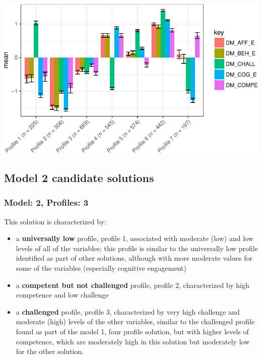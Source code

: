 \documentclass[]{book}
\providecommand{\tightlist}{%
  \setlength{\itemsep}{0pt}\setlength{\parskip}{0pt}}
\theoremstyle{definition}
\theoremstyle{definition}
\theoremstyle{definition}
\theoremstyle{remark}
\begin{document}
\begin{center}\includegraphics[width=0.8\linewidth]{rosenberg-dissertation_files/figure-latex/m1_7-other-LL-p-1} \end{center}

\subsection{Model 2 candidate
solutions}\label{model-2-candidate-solutions}

\subsubsection{Model: 2, Profiles: 3}\label{model-2-profiles-3}

This solution is characterized by:

\begin{itemize}
\tightlist
\item
  a \textbf{universally low} profile, profile 1, associated with
  moderate (low) and low levels of all of the variables; this profile is
  similar to the universally low profile identified as part of other
  solutions, although with more moderate values for some of the
  variables (especially cognitive engagement)
\item
  a \textbf{competent but not challenged} profile, profile 2,
  characterized by high competence and low challenge
\item
  a \textbf{challenged} profile, profile 3, characterized by very high
  challenge and moderate (high) levels of the other variables, similar
  to the challenged profile found as part of the model 1, four profile
  solution, but with higher levels of competence, which are moderately
  high in this solution but moderately low for the other solution.
\end{itemize}
\end{document}
